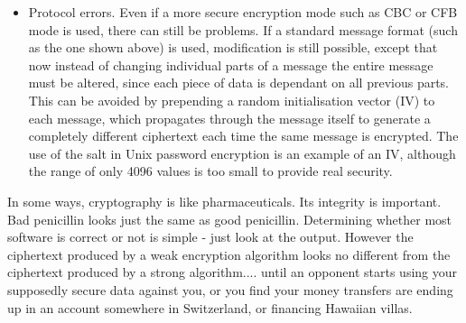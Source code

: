 \begin{itemize}
  {\tt \verb|  |E( Deposit \$10,000 in acct. number 12-3456-789012-3 )}

  Bob intercepts this message, and records it.  The encrypted message looks as
  follows:

  {\tt \verb|     |H+2nx/GHEKgvldSbqGQHbrUfotYFtUk6gS4CpMIuH7e2MPZCe}

  Later on in the day, he intercepts the following a message:

  {\tt \verb|     |H+2nx/GHEKgvldSbqGQHbrUfotYFtUk61Pts2LtOHa8oaNWpj}

  Since each block of text is completely independant of any surrounding block,
  he can simply insert the blocks corresponding to his account number:

  {\tt \verb|     |................................gS4CpMIuH7e2MPZCe}

  in place of the existing blocks, and thus alter the encrypted data without
  any knowledge of the encryption key used.  Bob has since gone on to early
  retirement in his new Hawaiian villa.

  ECB mode, and the more secure modes such as CBC and CFB are described in
  several standards.  Some of these standards make a reference to the
  insecurity of ECB mode, and recommend the use of the stronger CBC or CFB
  modes.  Usually implementors stop reading at the section on ECB, with the
  result being that many commercial packages which use DES and which do manage
  to get it correct end up using it in ECB mode.

\item Protocol errors.  Even if a more secure encryption mode such as CBC or CFB
  mode is used, there can still be problems.  If a standard message format
  (such as the one shown above) is used, modification is still possible, except
  that now instead of changing individual parts of a message the entire message
  must be altered, since each piece of data is dependant on all previous parts.
  This can be avoided by prepending a random initialisation vector (IV) to each
  message, which propagates through the message itself to generate a completely
  different ciphertext each time the same message is encrypted.  The use of the
  salt in Unix password encryption is an example of an IV, although the range
  of only 4096 values is too small to provide real security.
\end{itemize}

In some ways, cryptography is like pharmaceuticals.  Its integrity is
important.  Bad penicillin looks just the same as good penicillin.  Determining
whether most software is correct or not is simple - just look at the output.
However the ciphertext produced by a weak encryption algorithm looks no
different from the ciphertext produced by a strong algorithm.... until an
opponent starts using your supposedly secure data against you, or you find your
money transfers are ending up in an account somewhere in Switzerland, or
financing Hawaiian villas.


